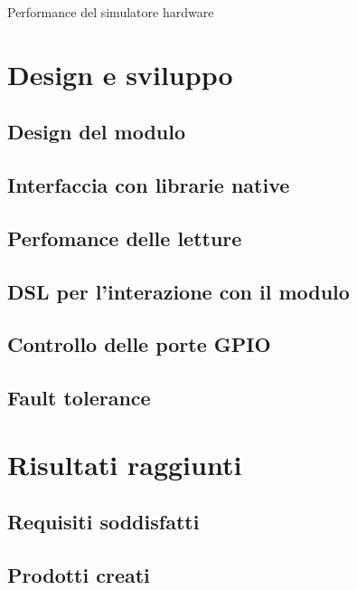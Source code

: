 \begin{risk}{Performance del simulatore hardware}
    \label{risk:hardware-simulator} 
\end{risk}

\section{Design e sviluppo}
\subsection{Design del modulo}
\subsection{Interfaccia con librarie native}
\subsection{Perfomance delle letture}
\subsection{DSL per l'interazione con il modulo}
\subsection{Controllo delle porte GPIO}
\subsection{Fault tolerance}


\section{Risultati raggiunti}
\subsection{Requisiti soddisfatti}
\subsection{Prodotti creati}